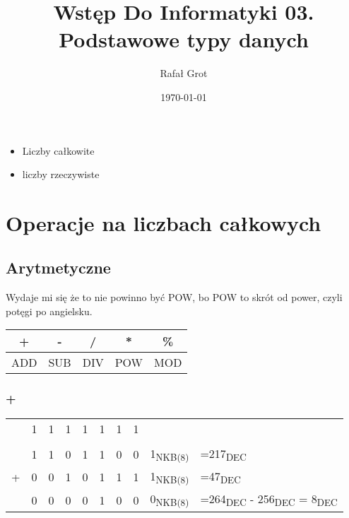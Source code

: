 \documentclass[11pt]{article}
\author{Rafał Grot}
\date{\today}
\title{Wstęp Do Informatyki 03. Podstawowe typy danych}
\begin{document}
\maketitle
\tableofcontents

\begin{itemize}
\item Liczby całkowite
\item liczby rzeczywiste
\end{itemize}
\section{Operacje na liczbach całkowych}
\label{sec:org9347533}
\subsection{Arytmetyczne}
\label{sec:org9e78307}
Wydaje mi się że to nie powinno być POW, bo POW to skrót od power, czyli potęgi po angielsku.
\begin{center}
\begin{tabular}{|c|c|c|c|c|}
\hline
+ & - & / & * & \%\\
\hline
ADD & SUB & DIV & POW & MOD\\
\hline
\end{tabular}
\end{center}
\subsubsection{+}
\label{sec:org7879579}
\begin{center}
\begin{tabular}{lrrrrrrrll}
 & 1 & 1 & 1 & 1 & 1 & 1 & 1 &  & \\
 &  &  &  &  &  &  &  &  & \\
 & 1 & 1 & 0 & 1 & 1 & 0 & 0 & 1\textsubscript{NKB(8)} & =217\textsubscript{DEC}\\
+ & 0 & 0 & 1 & 0 & 1 & 1 & 1 & 1\textsubscript{NKB(8)} & =47\textsubscript{DEC}\\
\hline
 & 0 & 0 & 0 & 0 & 1 & 0 & 0 & 0\textsubscript{NKB(8)} & =264\textsubscript{DEC} - 256\textsubscript{DEC} = 8\textsubscript{DEC}\\
\end{tabular}
\end{center}
\end{document}
